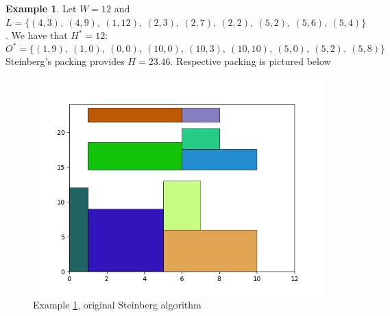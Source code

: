 \documentclass{article}
\theoremstyle{definition}
\newtheorem{example}{Example}
\theoremstyle{theorem}
\numberwithin{proposition}{section}
\begin{document}
    \begin{example}\label{ex4}
        Let $W = 12$ and $L = \{(4,3),~(4,9),~(1,12),~(2,3),~(2,7),~(2,2),~(5,2),~(5,6),~(5,4)\}$. We have that $H^{*} = 12$:
        \begin{equation*}
            O^{*}=\{(1,9),~(1,0),~(0,0),~(10,0),~(10,3),~(10,10),~(5,0),~(5,2),~(5,8)\}
        \end{equation*} 
        Steinberg’s packing provides $H = 23.46$. Respective packing is pictured below
        \begin{figure}[H]
            \centering
            \includegraphics[scale=0.5]{../examples/original-4.png}
            \caption{Example \ref{ex4}, original Steinberg algorithm}
        \end{figure} 
    \end{example}
\end{document}
